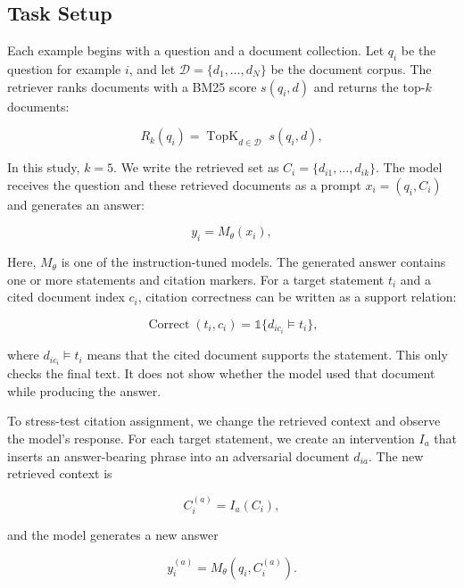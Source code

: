 \documentclass[a4paper,fleqn]{cas-sc}
\begin{document}
\subsection{Task Setup}

Each example begins with a question and a document collection. Let $q_i$ be the question for example $i$, and let $\mathcal{D}=\{d_1,\ldots,d_N\}$ be the document corpus. The retriever ranks documents with a BM25 score $s(q_i,d)$ \cite{robertson2009bm25} and returns the top-$k$ documents:

\begin{equation}
    R_k(q_i) = \operatorname{TopK}_{d \in \mathcal{D}}\; s(q_i,d),
\end{equation}

In this study, $k=5$. We write the retrieved set as $C_i=\{d_{i1},\ldots,d_{ik}\}$. The model receives the question and these retrieved documents as a prompt $x_i=(q_i,C_i)$ and generates an answer:

\begin{equation}
    y_i = M_{\theta}(x_i),
\end{equation}

Here, $M_{\theta}$ is one of the instruction-tuned models. The generated answer contains one or more statements and citation markers. For a target statement $t_i$ and a cited document index $c_i$, citation correctness can be written as a support relation:

\begin{equation}
    \operatorname{Correct}(t_i,c_i)=\mathbb{1}\{d_{ic_i} \models t_i\},
\end{equation}

where $d_{ic_i} \models t_i$ means that the cited document supports the statement. This only checks the final text. It does not show whether the model used that document while producing the answer.

To stress-test citation assignment, we change the retrieved context and observe the model's response. For each target statement, we create an intervention $I_a$ that inserts an answer-bearing phrase into an adversarial document $d_{ia}$. The new retrieved context is

\begin{equation}
    C_i^{(a)} = I_a(C_i),
\end{equation}

and the model generates a new answer

\begin{equation}
    y_i^{(a)} = M_{\theta}(q_i,C_i^{(a)}).
\end{equation}
\end{document}
